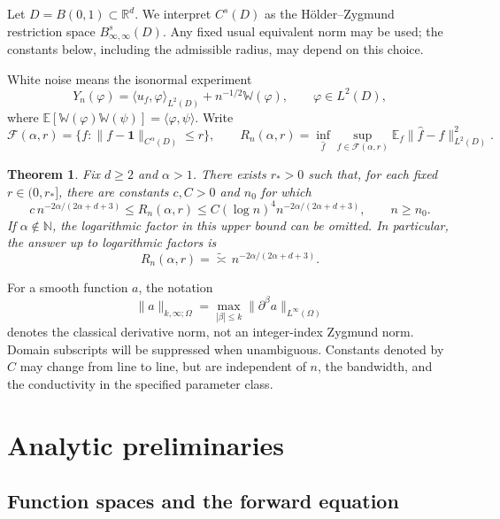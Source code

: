 \documentclass[11pt]{article}
\newtheorem{theorem}{Theorem}[section]
\theoremstyle{remark}
\newcommand{\R}{\mathbb R}
\newcommand{\E}{\mathbb E}
\newcommand{\one}{\mathbf 1}
\newcommand{\cF}{\mathcal F}
\begin{document}
Let \(D=B(0,1)\subset\R^d\). We interpret \(C^s(D)\) as the
H\"older--Zygmund restriction space \(B^s_{\infty,\infty}(D)\).
Any fixed usual equivalent norm may be used; the constants below,
including the admissible radius, may depend on this choice.

White noise means the isonormal experiment
\[
Y_n(\varphi)=\langle u_f,\varphi\rangle_{L^2(D)}
+n^{-1/2}\mathbb W(\varphi),\qquad \varphi\in L^2(D),
\]
where
\(\E[\mathbb W(\varphi)\mathbb W(\psi)]=\langle\varphi,\psi\rangle\).
Write
\[
\cF(\alpha,r)=
\{f:\|f-\one\|_{C^\alpha(D)}\leq r\},
\qquad
R_n(\alpha,r)=
\inf_{\widehat f}\sup_{f\in\cF(\alpha,r)}
\E_f\|\widehat f-f\|_{L^2(D)}^2.
\]

\begin{theorem}\label{thm:main}
Fix \(d\geq2\) and \(\alpha>1\). There exists \(r_*>0\) such that,
for each fixed \(r\in(0,r_*]\), there are constants
\(c,C>0\) and \(n_0\) for which
\[
c\,n^{-2\alpha/(2\alpha+d+3)}
\leq R_n(\alpha,r)
\leq
C(\log n)^4 n^{-2\alpha/(2\alpha+d+3)},
\qquad n\geq n_0.
\]
If \(\alpha\notin\mathbb N\), the logarithmic factor in this upper bound
can be omitted. In particular, the answer up to logarithmic factors is
\[
\boxed{\displaystyle
R_n(\alpha,r)=\widetilde{\asymp}\,
n^{-2\alpha/(2\alpha+d+3)}.}
\]
\end{theorem}

For a smooth function \(a\), the notation
\[
\|a\|_{k,\infty;\Omega}
=\max_{|\beta|\leq k}\|\partial^\beta a\|_{L^\infty(\Omega)}
\]
denotes the classical derivative norm, not an integer-index Zygmund
norm. Domain subscripts will be suppressed when unambiguous.
Constants denoted by \(C\) may change from line to line, but are
independent of \(n\), the bandwidth, and the conductivity in the
specified parameter class.

\section{Analytic preliminaries}

\subsection{Function spaces and the forward equation}

\end{document}
